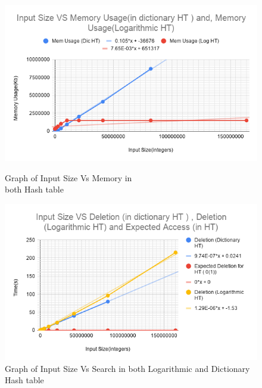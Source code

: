 \documentclass[a4paper,12pt, openany]{book}
\begin{document}
\begin{figure}
	\centering
	\begin{minipage}{.55\textwidth}
		\centering
		\includegraphics[height=\textwidth, width=\linewidth]{Memory.png}
		\caption{Graph of Input Size Vs Memory in\\ both  Hash table}
		\label{fig:test1}
	\end{minipage}%
	\begin{minipage}{.55\textwidth}
		\centering
		\includegraphics[height=\textwidth, width=\linewidth]{Deletion.png}
		\caption{Graph of Input Size Vs Search in both Logarithmic and Dictionary Hash table}
		\label{fig:test2}
	\end{minipage}
\end{figure}
\end{document}
